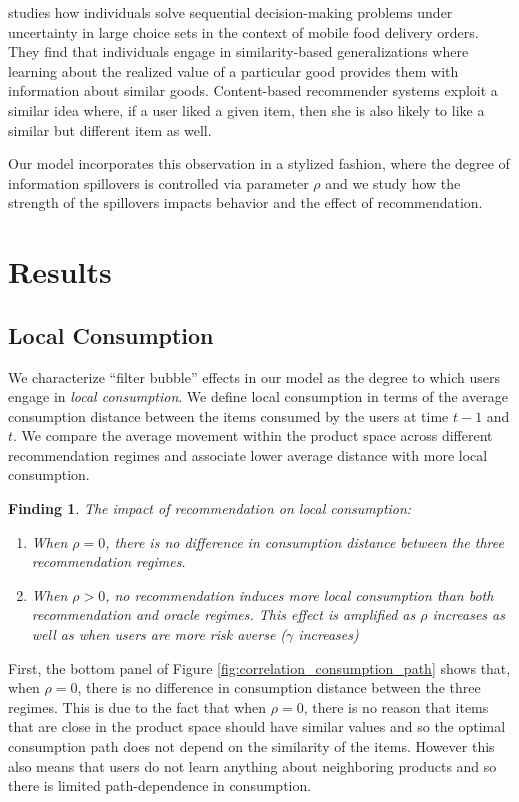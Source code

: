 \documentclass[sigconf]{acmart}
\newtheorem{finding}{Finding}
\begin{document}
\cite{schulz2019structured} studies how individuals solve sequential decision-making problems under uncertainty in large choice sets in the context of mobile food delivery orders. They find that individuals engage in similarity-based generalizations where learning about the realized value of a particular good provides them with information about similar goods. Content-based recommender systems exploit a similar idea where, if a user liked a given item, then she is also likely to like a similar but different item as well.
\par

Our model incorporates this observation in a stylized fashion, where the degree of information spillovers is controlled via parameter $\rho$ and we study how the strength of the spillovers impacts behavior and the effect of recommendation.
\par

\section{Results}
\subsection{Local Consumption}
We characterize ``filter bubble'' effects in our model as the degree to which users engage in \textit{local consumption}. We define local consumption in terms of the average consumption distance between the items consumed by the users at time $t-1$ and $t$. We compare the average movement within the product space across different recommendation regimes and associate lower average distance with more local consumption.



\begin{finding}\label{finding_local_consumption}
The impact of recommendation on local consumption:
\begin{enumerate}
\item When $\rho = 0$, there is no difference in consumption distance between the three recommendation regimes.
\item When $\rho > 0$, no recommendation induces more local consumption than both recommendation and oracle regimes. This effect is amplified as $\rho$ increases as well as when users are more risk averse ($\gamma$ increases)
\end{enumerate}
\end{finding}

First, the bottom panel of Figure \ref{fig:correlation_consumption_path} shows that, when $\rho = 0$, there is no difference in consumption distance between the three regimes. This is due to the fact that when $\rho = 0$, there is no reason that items that are close in the product space should have similar values and so the optimal consumption path does not depend on the similarity of the items. However this also means that users do not learn anything about neighboring products and so there is limited path-dependence in consumption.
\par
\end{document}
